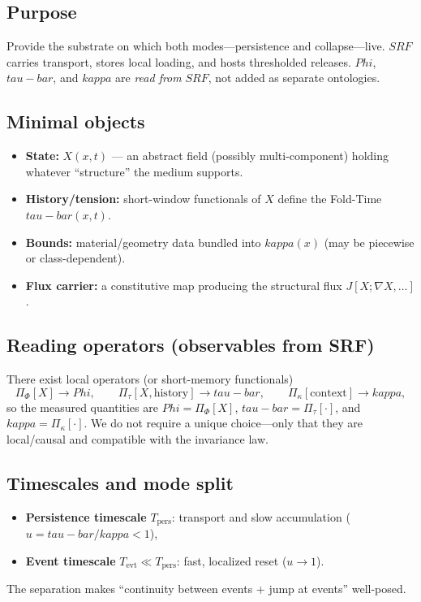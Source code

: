 \documentclass[12pt]{article}
\newcommand{\FoldDensity}{\Phi}
\newcommand{\FoldTime}{\bar{\tau}}
\newcommand{\Threshold}{\kappa}
\newcommand{\SRF}{\mathcal{F}_{\mathrm{SR}}}
\def\FoldDensity{Phi}%
\def\FoldTime{tau-bar}%
\def\Threshold{kappa}%
\def\SRF{SRF}%
\def\bar#1{#1}%
\def\mathcal#1{#1}%
\def\mathrm#1{#1}%
\begin{document}
\subsection{Purpose}
Provide the substrate on which both modes—persistence and collapse—live. $\SRF$ carries transport, stores local loading, and hosts thresholded releases. $\FoldDensity$, $\FoldTime$, and $\Threshold$ are \emph{read from} $\SRF$, not added as separate ontologies.

\subsection{Minimal objects}
\begin{itemize}
  \item \textbf{State:} $X(x,t)$ — an abstract field (possibly multi-component) holding whatever ``structure'' the medium supports.
  \item \textbf{History/tension:} short-window functionals of $X$ define the Fold-Time $\FoldTime(x,t)$.
  \item \textbf{Bounds:} material/geometry data bundled into $\Threshold(x)$ (may be piecewise or class-dependent).
  \item \textbf{Flux carrier:} a constitutive map producing the structural flux $J[X;\nabla X,\dots]$.
\end{itemize}

\subsection{Reading operators (observables from SRF)}
There exist local operators (or short-memory functionals)
\[
\Pi_\Phi[X] \to \FoldDensity,\qquad
\Pi_{\bar{\tau}}[X,\text{history}] \to \FoldTime,\qquad
\Pi_\kappa[\text{context}] \to \Threshold,
\]
so the measured quantities are $\FoldDensity=\Pi_\Phi[X]$, $\FoldTime=\Pi_{\bar{\tau}}[\cdot]$, and $\Threshold=\Pi_\kappa[\cdot]$.
We do not require a unique choice—only that they are local/causal and compatible with the invariance law.

\subsection{Timescales and mode split}
\begin{itemize}
  \item \textbf{Persistence timescale} $T_{\text{pers}}$: transport and slow accumulation ($u=\FoldTime/\Threshold<1$),
  \item \textbf{Event timescale} $T_{\text{evt}}\ll T_{\text{pers}}$: fast, localized reset ($u\to 1$).
\end{itemize}
The separation makes ``continuity between events + jump at events'' well-posed.
\end{document}
